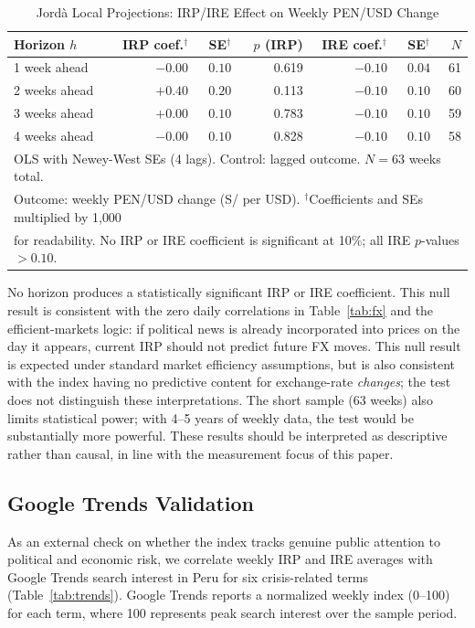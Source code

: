 \documentclass[12pt,a4paper]{article}
\begin{document}
\begin{table}[h!]
\centering
\caption{Jord\`{a} Local Projections: IRP/IRE Effect on Weekly PEN/USD Change}
\label{tab:lp}
\small
\begin{tabular}{lrrrrrr}
\toprule
Horizon $h$ & IRP coef.$^\dagger$ & SE$^\dagger$ & $p$ (IRP) & IRE coef.$^\dagger$ & SE$^\dagger$ & $N$ \\
\midrule
1 week  ahead & $-0.00$ & $0.10$ & 0.619 & $-0.10$ & $0.04$ & 61 \\
2 weeks ahead & $+0.40$ & $0.20$ & 0.113 & $-0.10$ & $0.10$ & 60 \\
3 weeks ahead & $+0.00$ & $0.10$ & 0.783 & $-0.10$ & $0.10$ & 59 \\
4 weeks ahead & $-0.00$ & $0.10$ & 0.828 & $-0.10$ & $0.10$ & 58 \\
\bottomrule
\multicolumn{7}{l}{\footnotesize OLS with Newey-West SEs (4 lags). Control: lagged outcome. $N = 63$ weeks total.} \\
\multicolumn{7}{l}{\footnotesize Outcome: weekly PEN/USD change (S/ per USD). $^\dagger$Coefficients and SEs multiplied by 1{,}000} \\
\multicolumn{7}{l}{\footnotesize for readability. No IRP or IRE coefficient is significant at 10\%; all IRE $p$-values $> 0.10$.}
\end{tabular}
\end{table}

No horizon produces a statistically significant IRP or IRE coefficient.
This null result is consistent with the zero daily correlations in
Table~\ref{tab:fx} and the efficient-markets logic: if political news is
already incorporated into prices on the day it appears, current IRP
should not predict future FX moves.  This null result is expected under
standard market efficiency assumptions, but is also consistent with the
index having no predictive content for exchange-rate \emph{changes}; the
test does not distinguish these interpretations.  The short sample (63
weeks) also limits statistical power; with 4--5 years of weekly data, the
test would be substantially more powerful.  These results should be
interpreted as descriptive rather than causal, in line with the
measurement focus of this paper.

\subsection{Google Trends Validation}
\label{subsec:trends}

As an external check on whether the index tracks genuine public attention
to political and economic risk, we correlate weekly IRP and IRE averages
with Google Trends search interest in Peru for six crisis-related terms
(Table~\ref{tab:trends}).  Google Trends reports a normalized weekly
index (0--100) for each term, where 100 represents peak search interest
over the sample period.
\end{document}

